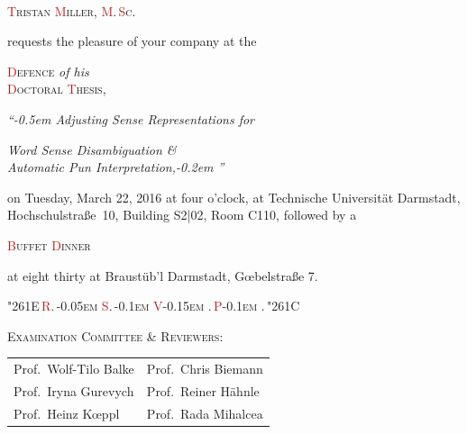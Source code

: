 \documentclass[12pt,a4paper]{article}
\newcommand{\h}[1]{\textcolor{FireBrick}{#1}}
\begin{document}
\mbox{~}\newpage
{}
\centering

\mbox{}

\vfill

{\huge {\textsc{\h{T}ristan \h{M}iller{\small, \h{M}.\,\h{S}c.}}}}

\bigskip

requests the pleasure of your company at the

\medskip

{\huge {\textsc{\h{D}efence} {\LARGE \emph{of his}}\\[0.4ex]
\textsc{\h{D}octoral \h{T}hesis,}}}

\bigskip

{\Large \emph{``\kern-0.5em Adjusting Sense
    {R}epresentations for}

    \emph{Word Sense Disambiguation \&}\\[0.45ex]

\emph{Automatic Pun Interpretation,\kern-0.2em ''}}

\bigskip

on Tuesday, March 22, 2016 at four o'clock,
at Technische Universität Darmstadt, Hochschulstraße~10, Building
S2|02, Room C110, followed by a

\bigskip

{\huge \textsc{\h{B}uffet \h{D}inner}}

\bigskip

at eight thirty at Braustüb'l Darmstadt, Gœbelstraße 7.

\bigskip \bigskip

{\Huge \char"261E\,\textsc{\h{R}.\,\kern-0.05em \h{S}.\,\kern-0.1em
\h{V}\kern-0.15em .\,\h{P}\kern-0.1em .\,\char"261C}}

\bigskip \bigskip

\textsc{Examination Committee \& Reviewers:}

\medskip

{\small\em%
    \begin{tabular}{ll}
        Prof.~Wolf-Tilo Balke & Prof.~Chris Biemann \\
        Prof.~Iryna Gurevych  & Prof.~Reiner Hähnle \\
        Prof.~Heinz Kœppl     & Prof.~Rada Mihalcea \\
    \end{tabular}%
}

\vfill
\end{document}
